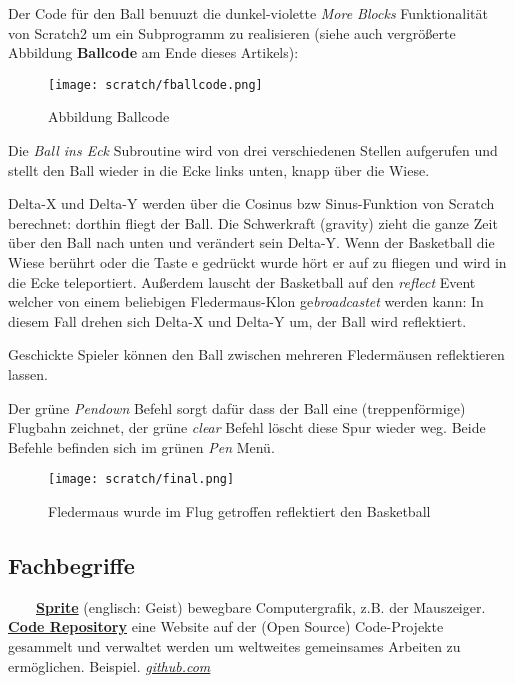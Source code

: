 \documentclass[10pt,a4paper,ngerman,twoside]{article} %
\begin{document}
Der Code für den Ball benuuzt die dunkel-violette \textit{More Blocks} Funktionalität von Scratch2 um ein Subprogramm zu realisieren 
(siehe auch vergrößerte Abbildung \textbf{Ballcode} am Ende dieses Artikels):
\begin{figure}
\texttt{[image: scratch/fballcode.png]}
\caption{Abbildung Ballcode}
\end{figure}

Die \textit{Ball ins Eck} Subroutine wird von drei verschiedenen Stellen aufgerufen und stellt den Ball wieder in die Ecke links unten, knapp über die Wiese.

Delta-X und Delta-Y werden über die Cosinus bzw Sinus-Funktion von Scratch berechnet: dorthin fliegt der Ball. Die Schwerkraft (gravity) zieht die ganze Zeit über den Ball nach unten und verändert sein Delta-Y. Wenn der Basketball die Wiese berührt oder die Taste e gedrückt wurde hört er auf zu fliegen und wird in die Ecke teleportiert. Außerdem lauscht der Basketball auf den \textit{reflect} Event welcher von einem beliebigen Fledermaus-Klon ge\textit{broadcastet} werden kann: In diesem Fall drehen sich Delta-X und Delta-Y um, der Ball wird reflektiert. 

Geschickte Spieler können den Ball zwischen mehreren Fledermäusen reflektieren lassen. 

Der grüne \textit{Pendown} Befehl sorgt dafür dass der Ball eine (treppenförmige) Flugbahn zeichnet, der grüne \textit{clear} Befehl löscht diese Spur wieder weg. Beide Befehle befinden sich im grünen \textit{Pen} Menü.

\begin{figure}
\texttt{[image: scratch/final.png]}
\caption{Fledermaus wurde im Flug getroffen reflektiert den Basketball}
\end{figure}


\subsection*{Fachbegriffe}

~~~~\href{https://de.wikipedia.org/wiki/Sprite_(Computergrafik)}{\textbf{Sprite}} (englisch: Geist) bewegbare Computergrafik, z.B. der Mauszeiger.\\

\href{https://en.wikipedia.org/wiki/Source_code_repository}{\textbf{Code Repository}} eine Website auf der (Open Source) Code-Projekte gesammelt und verwaltet werden um weltweites gemeinsames Arbeiten zu ermöglichen. Beispiel. \href{http://github.com}{\textit{github.com}}\\
\end{document}
